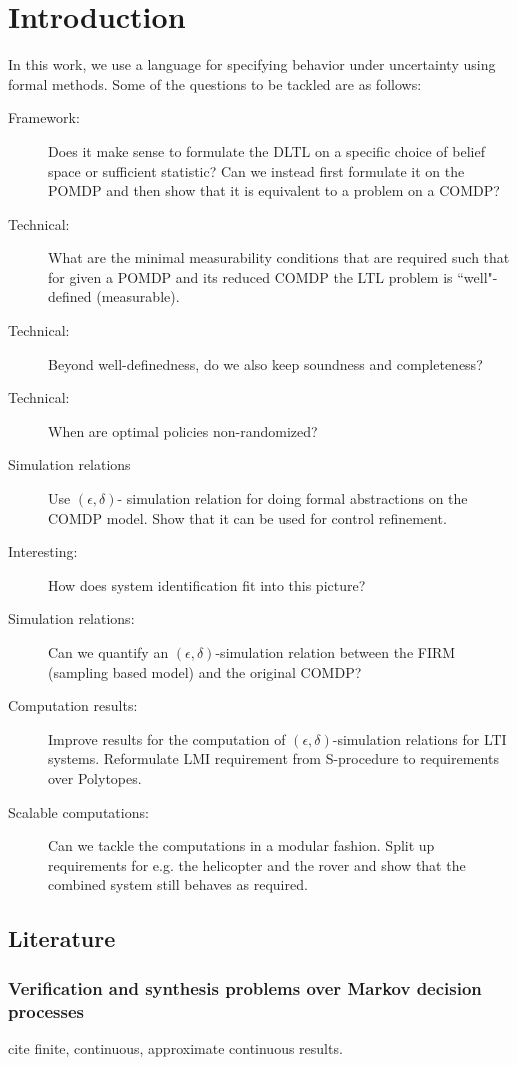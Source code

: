\documentclass{ifacconf}
\newcommand{\red}[1]{{\color{red} #1}}
\begin{document}
\section{Introduction} \label{subsec:intro}
In this work, we use a language for specifying behavior under uncertainty using formal methods. 
Some of the questions to be tackled are as follows:
\begin{description}
	\item[Framework:] Does it make sense to formulate the DLTL on a specific choice of belief space or sufficient statistic? Can we instead first formulate it on the POMDP and then show that it  is equivalent to a problem on a COMDP?
	\item[Technical:]  What are the minimal measurability conditions that are required such that for given a POMDP and its reduced COMDP  the LTL problem is ``well"-defined (measurable).
	\item[Technical:] Beyond well-definedness, do we also keep soundness and completeness?
	\item[Technical:] When are optimal policies non-randomized? 
	\item[Simulation relations]  Use $(\epsilon,\delta)$- simulation relation for doing formal abstractions on the COMDP model.
	Show that it can be used for control refinement.
	\item[Interesting:] How does system identification fit into this picture?
	\item[Simulation relations:] Can we quantify an $(\epsilon,\delta)$-simulation relation between the FIRM  (sampling based model) and the original COMDP?
	\item[Computation results:] Improve results for the computation of $(\epsilon,\delta)$-simulation relations for LTI systems. Reformulate LMI requirement from S-procedure to requirements over Polytopes. 
	\item[Scalable computations:] Can we  tackle the computations in a modular fashion. Split up requirements for e.g. the helicopter and the rover and show that the combined system still behaves as required.
	 
\end{description}


\subsection{Literature}
\subsubsection{Verification and synthesis problems over Markov decision processes}
\red{cite finite, continuous, approximate continuous results}.
\end{document}

